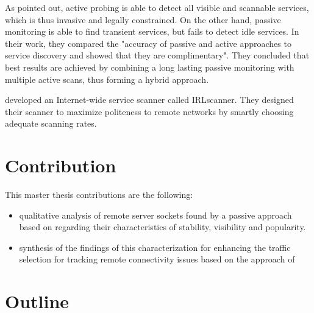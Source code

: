As \citet{Bartlett07b} pointed out, active probing is able to detect all
visible and scannable services, which is thus invasive and legally constrained.
On the other hand, passive monitoring is able to find transient services, but
fails to detect idle services. In their work, they compared the "accuracy of
passive and active approaches to service discovery and showed that they are
complimentary"\citep{Bartlett07b}. They concluded that best results are achieved 
by combining a long lasting passive monitoring with multiple active scans, thus 
forming a hybrid approach\citep{Bartlett07b}. 

\citet{Leonard:2010} developed an Internet-wide service scanner called
IRLscanner. They designed their scanner to maximize politeness to remote
networks by smartly choosing adequate scanning rates. 

\section{Contribution 
\label{sec:contribution}}
This master thesis contributions are the following: 
\begin{itemize}
	\item qualitative analysis of remote server sockets found by a passive approach based on \citet{Schatzmann:Mining,Schatzmann:Dissection, Schatzmann:Tracing} regarding their characteristics of stability, visibility and popularity.
	\item synthesis of the findings of this characterization for enhancing the traffic selection for tracking remote connectivity issues based on the approach of \citet{SchatzmannPAM2011} 
\end{itemize}

\section{Outline
\label{sec:outline}}



